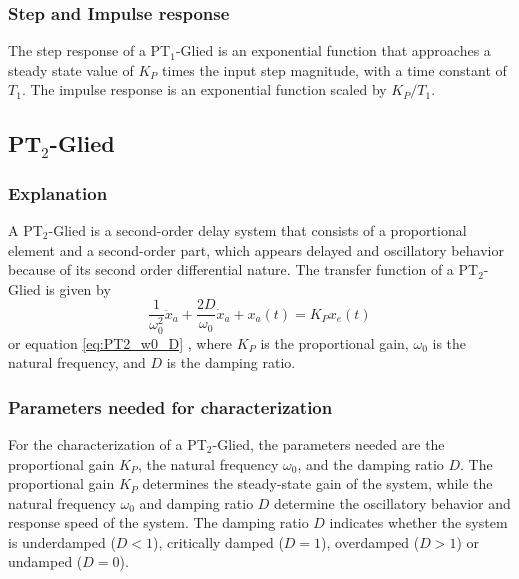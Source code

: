 \documentclass[12pt, oneside, a4paper]{scrreprt}
\begin{document}
                \subsubsection{Step and Impulse response}
                    The step response of a PT$_1$-Glied is an exponential function that approaches a steady state value of $K_P$ times the input step magnitude, with a time constant of $T_1$. The impulse response is an exponential function scaled by $K_P/T_1$.

            \cleardoublepage

            \subsection{PT$_2$-Glied}

                \subsubsection{Explanation}
                    
                    A PT$_2$-Glied is a second-order delay system that consists of a proportional element and a second-order part, which appears delayed and oscillatory behavior because of its second order differential nature. The transfer function of a PT$_2$-Glied is given by 
                    \begin{equation}
                        \frac{1}{\omega_0^2} \ddot{x}_a + \frac{2D}{\omega_0} \dot{x}_a + x_a(t) = K_P x_e(t)
                    \end{equation}
                    or equation \ref{eq:PT2_w0_D} , where $K_P$ is the proportional gain, $\omega_0$ is the natural frequency, and $D$ is the damping ratio.

                \subsubsection{Parameters needed for characterization}
                    For the characterization of a PT$_2$-Glied, the parameters needed are the proportional gain $K_P$, the natural frequency $\omega_0$, and the damping ratio $D$. The proportional gain $K_P$ determines the steady-state gain of the system, while the natural frequency $\omega_0$ and damping ratio $D$ determine the oscillatory behavior and response speed of the system. The damping ratio $D$ indicates whether the system is underdamped ($D < 1$), critically damped ($D = 1$), overdamped ($D > 1$) or undamped ($D = 0$).
\end{document}
